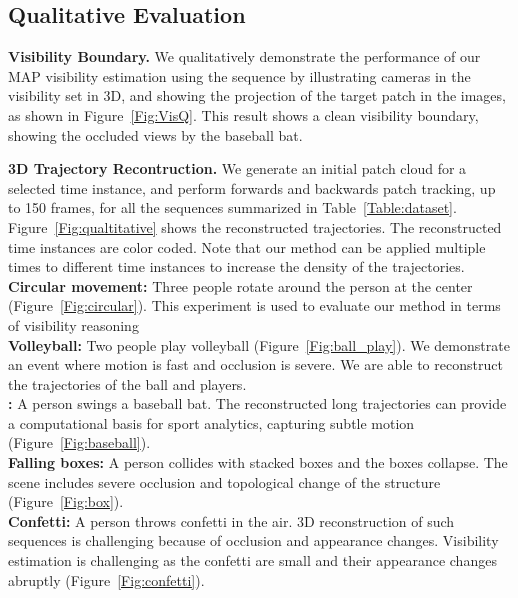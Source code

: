 \subsection{Qualitative Evaluation}
\noindent \textbf{Visibility Boundary.} We qualitatively demonstrate the performance of our MAP visibility estimation using the  sequence by illustrating cameras in the visibility set in 3D, and showing the projection of the target patch in the images, as shown in Figure~\ref{Fig:VisQ}. This result shows a clean visibility boundary, showing the occluded views by the baseball bat.  

\noindent \textbf{3D Trajectory Recontruction.}
We generate an initial patch cloud for a selected time instance, and perform forwards and backwards patch tracking, up to 150 frames, for all the sequences summarized in Table~\ref{Table:dataset}. Figure~\ref{Fig:qualtitative} shows the reconstructed trajectories. The reconstructed time instances are color coded. Note that our method can be applied multiple times to different time instances to increase the density of the trajectories. \\
\textbf{Circular movement:} Three people rotate around the person at the center (Figure~\ref{Fig:circular}). This experiment is used to evaluate our method in terms of visibility reasoning\\
\textbf{Volleyball:} Two people play volleyball (Figure~\ref{Fig:ball_play}). We demonstrate an event where motion is fast and occlusion is severe. We are able to reconstruct the trajectories of the ball and players.\\
\textbf{:} A person swings a baseball bat. The reconstructed long trajectories can provide a computational basis for sport analytics, capturing subtle motion (Figure~\ref{Fig:baseball}).\\
\textbf{Falling boxes:} A person collides with stacked boxes and the boxes collapse. The scene includes severe occlusion and topological change of the structure (Figure~\ref{Fig:box}).\\
\textbf{Confetti:} A person throws confetti in the air. 3D reconstruction of such sequences is challenging because of occlusion and appearance changes. Visibility estimation is challenging as the confetti are small and their appearance changes abruptly (Figure~\ref{Fig:confetti}). \\
